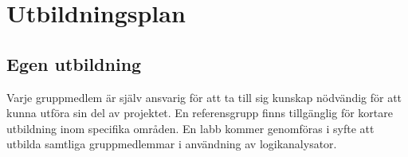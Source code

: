 \section{Utbildningsplan}

\subsection{Egen utbildning}
Varje gruppmedlem är själv ansvarig för att ta till sig kunskap nödvändig för att kunna utföra sin del av projektet. En referensgrupp finns tillgänglig för kortare utbildning inom specifika områden. En labb kommer genomföras i syfte att utbilda samtliga gruppmedlemmar i användning av logikanalysator. 